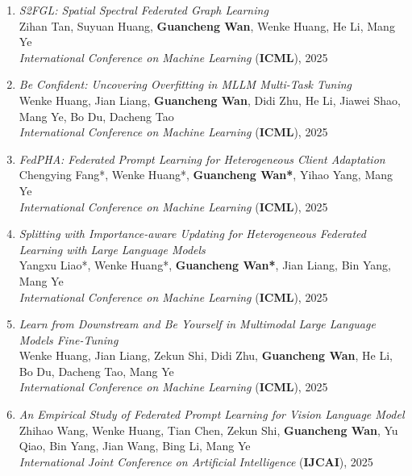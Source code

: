 \begin{enumerate}
    \item \textit{S2FGL: Spatial Spectral Federated Graph Learning} \\
    Zihan Tan, Suyuan Huang, \textbf{Guancheng Wan}, Wenke Huang, He Li, Mang Ye \\
    \hfill \textit{International Conference on Machine Learning} (\textbf{ICML}), 2025

    \item \textit{Be Confident: Uncovering Overfitting in MLLM Multi-Task Tuning} \\
    Wenke Huang, Jian Liang, \textbf{Guancheng Wan}, Didi Zhu, He Li, Jiawei Shao, Mang Ye, Bo Du, Dacheng Tao \\
    \hfill \textit{International Conference on Machine Learning} (\textbf{ICML}), 2025

    \item \textit{FedPHA: Federated Prompt Learning for Heterogeneous Client Adaptation} \\
    Chengying Fang*, Wenke Huang*, \textbf{Guancheng Wan*}, Yihao Yang, Mang Ye \\
    \hfill \textit{International Conference on Machine Learning} (\textbf{ICML}), 2025

    \item \textit{Splitting with Importance-aware Updating for Heterogeneous Federated Learning with Large Language Models} \\
    Yangxu Liao*, Wenke Huang*, \textbf{Guancheng Wan*}, Jian Liang, Bin Yang, Mang Ye \\
    \hfill \textit{International Conference on Machine Learning} (\textbf{ICML}), 2025

    \item \textit{Learn from Downstream and Be Yourself in Multimodal Large Language Models Fine-Tuning} \\
    Wenke Huang, Jian Liang, Zekun Shi, Didi Zhu, \textbf{Guancheng Wan}, He Li, Bo Du, Dacheng Tao, Mang Ye \\
    \hfill \textit{International Conference on Machine Learning} (\textbf{ICML}), 2025

    \item \textit{An Empirical Study of Federated Prompt Learning for Vision Language Model} \\
    Zhihao Wang, Wenke Huang, Tian Chen, Zekun Shi, \textbf{Guancheng Wan}, Yu Qiao, Bin Yang, Jian Wang, Bing Li, Mang Ye \\
    \hfill \textit{International Joint Conference on Artificial Intelligence} (\textbf{IJCAI}), 2025


\end{enumerate}
